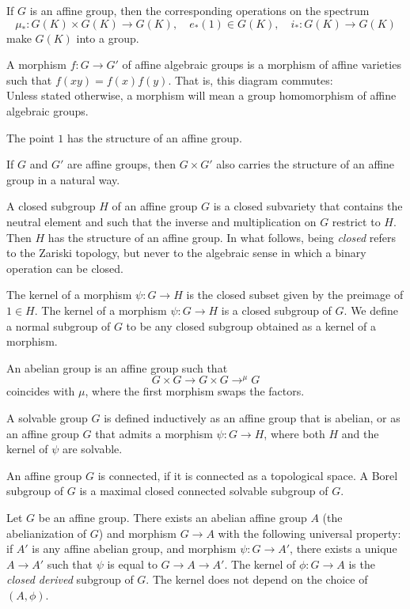 If $G$ is an affine group, then the corresponding operations
on the spectrum
\[
\mu_*:G(K)\times G(K)\to G(K),\quad e_*(1)\in G(K),\quad i_*:G(K)\to G(K)
\]
make $G(K)$ into a group.


A morphism $f:G\to G'$ of affine algebraic groups is a morphism
of affine varieties such that $f(x y) = f(x) f(y)$.  That is,
this diagram commutes:
\[
\]
Unless stated otherwise, a morphism will mean a group homomorphism of
affine algebraic groups.

The point $1$ has the structure of an affine group.

If $G$ and $G'$ are affine groups, then $G \times G'$ also
carries the structure of an affine group in a natural way.

A closed subgroup $H$ of an affine group $G$ is a closed subvariety
that contains the neutral element and such that the inverse and
multiplication on $G$ restrict to $H$.  Then $H$ has the structure of
an affine group.  In what follows, being {\it closed} refers to the
Zariski topology, but never to the algebraic sense in which a binary
operation can be closed.

The kernel of a morphism $\psi:G\to H$ is the closed subset given by
the preimage of $1\in H$.  The kernel of a morphism $\psi:G\to H$ is a
closed subgroup of $G$.  We define a normal subgroup of $G$ to be any
closed subgroup obtained as a kernel of a morphism.

An abelian group is an affine group such that
\[
G \times G \to G \times G \to^\mu G
\]
coincides with $\mu$, where the first morphism swaps the factors.

A solvable group $G$ is defined inductively as an affine group that is
abelian, or as an affine group $G$ that admits a morphism $\psi:G\to
H$, where both $H$ and the kernel of $\psi$ are solvable.

An affine group $G$ is connected, if it is connected as a topological
space.
A Borel subgroup of $G$ is a maximal closed connected solvable
subgroup of $G$.

Let $G$ be an affine group.  There exists an abelian affine group $A$
(the abelianization of $G$) and morphism $G\to A$ with the following
universal property: if $A'$ is any affine abelian group, and morphism
$\psi: G \to A'$, there exists a unique $A\to A'$ such that $\psi$ is
equal to $G\to A \to A'$.  The kernel of $\phi:G\to A$ is the
{\it closed derived} subgroup of $G$.   The kernel does not depend
on the choice of $(A,\phi)$.


